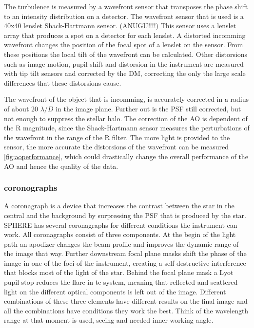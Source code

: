 \documentclass[twoside,single]{lion-msc}
\begin{document}
The turbulence is measured by a wavefront sensor that transposes the phase shift to an intensity distribution on a detector. The wavefront sensor that is used is a 40x40 lenslet Shack-Hartmann sensor. (ANUGU!!!!) This sensor uses a lenslet array that produces a spot on a detector for each lenslet. A distorted incomming wavefront changes the position of the focal spot of a lenslet on the sensor. From these positions the local tilt of the wavefront can be calculated. Other distorsions such as image motion, pupil shift and distorsion in the instrument are measured with tip tilt sensors and corrected by the DM, correcting the only the large scale differences that these distorsions cause.
\bigskip

The wavefront of the object that is incomming, is accurately corrected in a radius of about 20 $\lambda/D$ in the image plane. Further out is the PSF still corrected, but not enough to suppress the stellar halo. The correction of the AO is dependent of the R magnitude, since the Shack-Hartmann sensor measures the perturbations of the wavefront in the range of the R filter. The more light is provided to the sensor, the more accurate the distorsions of the wavefront can be measured \ref{fig:aoperformance}, which could drastically change the overall performance of the AO and hence the quality of the data.

\subsubsection{coronographs}
A coronagraph is a device that increases the contrast between the star in the central and the background by surpressing the PSF that is produced by the star. SPHERE has several coronagraphs for different conditions the instrument can work. All coronagraphs consist of three components. At the begin of the light path an apodizer changes the beam profile and improves the dynamic range of the image that way. Further downstream focal plane masks shift the phase of the image in one of the foci of the instrument, creating a self-destructive interference that blocks most of the light of the star.  Behind the focal plane mask a Lyot pupil stop reduces the flare in te system, meaning that reflected and scattered light on the different optical components is left out of the image. Different combinations of these three elements have different results on the final image and all the combinations have conditions they work the best. Think of the wavelength range at that moment is used, seeing and needed inner working angle.
\end{document}
